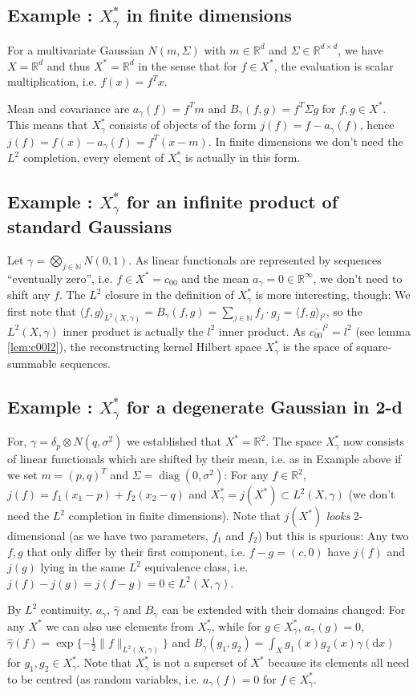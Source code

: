\documentclass{scrartcl}
\theoremstyle{definition}
\theoremstyle{remark}
\newcommand{\de}{\mathrm d}
\newcommand{\N}{\mathbb N}
\newcommand{\R}{\mathbb R}
\newcommand*\circled[1]{\tikz[baseline=(char.base)]{
            \node[shape=circle,draw,inner sep=2pt] (char) {#1};}}
\DeclareRobustCommand{\myboxtwo}[2][blue!20]{%
\begin{tcolorbox}[   %
        breakable,
        left=0pt,
        right=0pt,
        top=0pt,
        bottom=0pt,
        colback=#1,
        colframe=#1,
        width=\dimexpr\textwidth\relax, 
        enlarge left by=0mm,
        boxsep=5pt,
        arc=10pt,outer arc=10pt,
        ]
        #2
\end{tcolorbox}
}
\begin{document}
\myboxtwo{
\subsection*{Example \circled{1}: $X_\gamma^*$ in finite dimensions}
For a multivariate Gaussian $N(m,\Sigma)$ with $m\in \R^d$ and $\Sigma\in \R^{d\times d}$, we have $X = \R^d$ and thus $X^* = \R^d$ in the sense that for $f\in X^*$, the evaluation is scalar multiplication, i.e. $f(x) = f^T x$.

Mean and covariance are $a_\gamma(f) = f^Tm$ and $B_\gamma(f, g) = f^T\Sigma g$ for $f,g\in X^*$. This means that $X_\gamma^*$ consists of objects of the form $j(f) = f - a_\gamma(f)$, hence $j(f) = f(x) - a_\gamma(f) = f^T(x-m)$. In finite dimensions we don't need the $L^2$ completion, every element of $X_\gamma^*$ is actually in this form. 
}

\myboxtwo{
\subsection*{Example \circled{2}: $X_\gamma^*$ for an infinite product of standard Gaussians}
Let $\gamma =  \bigotimes_{j\in\N} N(0,1)$. As linear functionals are represented by sequences ``eventually zero'', i.e. $f\in X^* = c_{00}$ and the mean $a_\gamma = 0\in\R^\infty$, we don't need to shift any $f$. The $L^2$ closure in the definition of $X_\gamma^*$ is more interesting, though: We first note that $\langle f,g\rangle_{L^2(X, \gamma)} = B_\gamma(f, g) = \sum_{j\in\N}f_j\cdot g_j = \langle f,g\rangle_{l^2}$, so the $L^2(X,\gamma)$ inner product is actually the $l^2$ inner product. As $\overline{c_{00}}^{l^2} = l^2$ (see lemma \ref{lem:c00l2}), the reconstructing kernel Hilbert space $X_\gamma^*$ is the space of square-summable sequences.
}
\myboxtwo{
\subsection*{Example \circled{3}: $X_\gamma^*$ for a degenerate Gaussian in 2-d}
For, $\gamma = \delta_p \otimes N(q, \sigma^2)$ we established that $X^* = \R^2$. The space $X_\gamma^*$ now consists of linear functionals which are shifted by their mean, i.e. as in Example \circled{1} above if we set $m = (p,q)^T$ and $\Sigma = \operatorname{diag}(0,\sigma^2)$: For any $f\in \R^2$, $j(f) = f_1(x_1-p) + f_2(x_2-q)$ and $X_\gamma^* = j(X^*)\subset L^2(X,\gamma)$ (we don't need the $L^2$ completion in finite dimensions). Note that $j(X^*)$ \emph{looks} 2-dimensional (as we have two parameters, $f_1$ and $f_2$) but this is spurious: Any two $f, g$ that only differ by their  first component, i.e. $f-g = (c, 0)$ have $j(f)$ and $j(g)$ lying in the same $L^2$ equivalence class, i.e. $j(f)-j(g) = j(f-g) = 0\in L^2(X,\gamma)$.
}
By $L^2$ continuity, $a_\gamma$, $\hat \gamma$ and $B_\gamma$ can be extended with their domains changed: For any $X^*$ we can also use elements from $X_\gamma^*$, while for $g\in X_\gamma^*$, $a_\gamma(g) = 0$, $\hat \gamma(f) = \exp\{-\frac{1}{2}\|f\|_{L^2(X,\gamma)}\}$ and $B_\gamma(g_1, g_2) = \int_X g_1(x)g_2(x)\gamma(\de x)$ for $g_1,g_2\in X_\gamma^*$. Note that $X_\gamma^*$ is not a superset of $X^*$ because its elements all need to be centred (as random variables, i.e. $a_\gamma(f) = 0$ for $f\in X_\gamma^*$.
\end{document}
